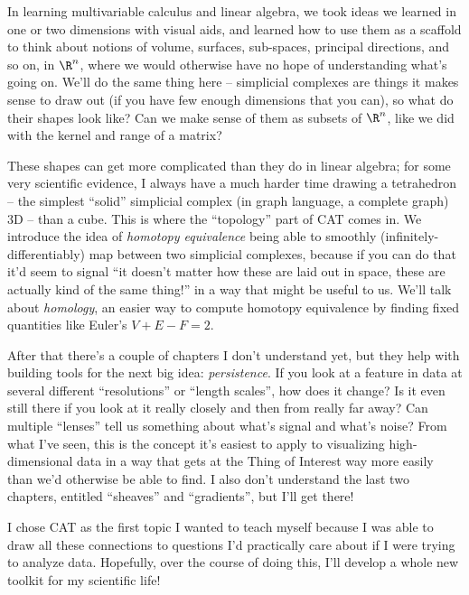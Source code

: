 \documentclass{lec}
\begin{document}
    In learning multivariable calculus and linear algebra, we took ideas we learned in one or two dimensions with visual aids, and learned how to use them as a scaffold to think about notions of volume, surfaces, sub-spaces, principal directions, and so on, in $\R^n$, where we would otherwise have no hope of understanding what's going on. We'll do the same thing here -- simplicial complexes are things it makes sense to draw out (if you have few enough dimensions that you can), so what do their shapes look like? Can we make sense of them as subsets of $\R^n$, like we did with the kernel and range of a matrix?

    These shapes can get more complicated than they do in linear algebra; for some very scientific evidence, I always have a much harder time drawing a tetrahedron -- the simplest ``solid'' simplicial complex (in graph language, a complete graph) 3D -- than a cube. This is where the ``topology'' part of CAT comes in. We introduce the idea of \textit{homotopy equivalence} being able to smoothly (infinitely-differentiably) map between two simplicial complexes, because if you can do that it'd seem to signal ``it doesn't matter how these are laid out in space, these are actually kind of the same thing!'' in a way that might be useful to us. We'll talk about \textit{homology}, an easier way to compute homotopy equivalence by finding fixed quantities like Euler's $V + E - F = 2$. 
    
    After that there's a couple of chapters I don't understand yet, but they help with building tools for the next big idea: \textit{persistence}. If you look at a feature in data at several different ``resolutions'' or ``length scales'', how does it change? Is it even still there if you look at it really closely and then from really far away? Can multiple ``lenses'' tell us something about what's signal and what's noise? From what I've seen, this is the concept it's easiest to apply to visualizing high-dimensional data in a way that gets at the Thing of Interest way more easily than we'd otherwise be able to find. I also don't understand the last two chapters, entitled ``sheaves'' and ``gradients'', but I'll get there!

    I chose CAT as the first topic I wanted to teach myself because I was able to draw all these connections to questions I'd practically care about if I were trying to analyze data. Hopefully, over the course of doing this, I'll develop a whole new toolkit for my scientific life!
\end{document}
